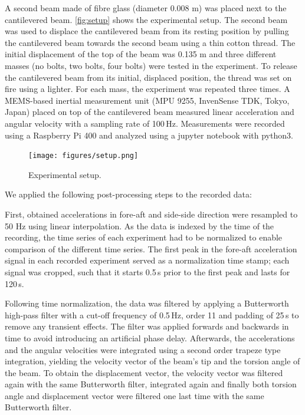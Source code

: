 \documentclass{article}
\begin{document}
A second beam made of fibre glass (diameter 0.008 m) was placed next to the cantilevered beam. \autoref{fig:setup} shows the experimental setup. The second beam was used to displace the cantilevered beam from its resting position by pulling the cantilevered beam towards the second beam using a thin cotton thread. The initial displacement of the top of the beam was 0.135 m and three different masses (no bolts, two bolts, four bolts) were tested in the experiment. To release the cantilevered beam from its initial, displaced position, the thread was set on fire using a lighter. For each mass, the experiment was repeated three times. A MEMS-based inertial measurement unit (MPU 9255, InvenSense TDK, Tokyo, Japan) placed on top of the cantilevered beam measured linear acceleration and angular velocity with a sampling rate of 100\,Hz. Measurements were recorded using a Raspberry Pi 400 and analyzed using a jupyter notebook with python3.

\begin{figure}[ht!]
    \centering
    \texttt{[image: figures/setup.png]}
    \caption{Experimental setup.}
    \label{fig:setup}
\end{figure}

We applied the following post-processing steps to the recorded data:

First, obtained accelerations in fore-aft and side-side direction were resampled to 50 Hz using linear interpolation. As the data is indexed by the time of the recording, the time series of each experiment had to be normalized to enable comparison of the different time series. The first peak in the fore-aft acceleration signal in each recorded experiment served as a normalization time stamp; each signal was cropped, such that it starts 0.5\,s prior to the first peak and lasts for 120\,s. 

Following time normalization, the data was filtered by applying a Butterworth high-pass filter with a cut-off frequency of 0.5\,Hz, order 11 and padding of 25\,s to remove any transient effects. The filter was applied forwards and backwards in time to avoid introducing an artificial phase delay. Afterwards, the accelerations and the angular velocities were integrated using a second order trapeze type integration, yielding the velocity vector of the beam's tip and the torsion angle of the beam. To obtain the displacement vector, the velocity vector was filtered again with the same Butterworth filter, integrated again and finally both torsion angle and displacement vector were filtered one last time with the same Butterworth filter.
\end{document}

